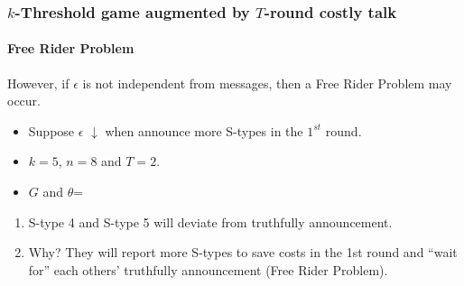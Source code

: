 \documentclass[8pt]{beamer}
\begin{document}
\begin{frame}
   \frametitle{$k$-Threshold game augmented by $T$-round costly talk}
\framesubtitle{Free Rider Problem}

\alert{However}, if $\epsilon$ is \alert{not independent from messages}, then a \alert{Free Rider Problem} may occur.
\begin{itemize}
\item Suppose $\epsilon$ \alert{$\downarrow$} when announce \alert{more} S-types in the \alert{$1^{st}$} round.
\item $k=5$, $n=8$ and $T=2$.
\item $G$ and $\theta$=
\begin{center}
\end{center}



\end{itemize}

\begin{enumerate}
\item S-type \alert{4} and S-type \alert{5} will deviate from truthfully announcement.
\item Why? They will report more S-types to save costs in the 1st round and ``wait for'' each others' truthfully announcement (Free Rider Problem).
\end{enumerate}


\end{frame}
\end{document}
